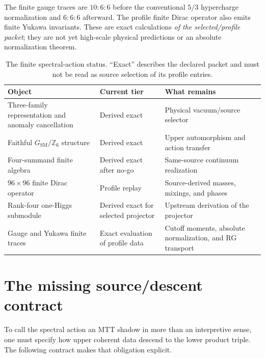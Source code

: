 \documentclass[11pt]{article}
\begin{document}
The finite gauge traces are $10:6:6$ before the conventional $5/3$
hypercharge normalization and $6:6:6$ afterward.  The profile finite Dirac
operator also emits finite Yukawa invariants.  These are exact calculations
\emph{of the selected/profile packet}; they are not yet high-scale physical
predictions or an absolute normalization theorem.

\begin{table}[ht]
\centering
\small
\begin{tabular}{>{\raggedright\arraybackslash}p{}
                >{\raggedright\arraybackslash}p{}
                >{\raggedright\arraybackslash}p{}}
\toprule
Object & Current tier & What remains \\
\midrule
Three-family representation and anomaly cancellation
& Derived exact
& Physical vacuum/source selector \\
Faithful $G_{\mathrm{SM}}/\mathbb{Z}_6$ structure
& Derived exact
& Upper automorphism and action transfer \\
Four-summand finite algebra
& Derived exact after no-go
& Same-source continuum realization \\
$96\times96$ finite Dirac operator
& Profile replay
& Source-derived masses, mixings, and phases \\
Rank-four one-Higgs submodule
& Derived exact for selected projector
& Upstream derivation of the projector \\
Gauge and Yukawa finite traces
& Exact evaluation of profile data
& Cutoff moments, absolute normalization, and RG transport \\
\bottomrule
\end{tabular}
\caption{The finite spectral-action status.  ``Exact'' describes the declared
packet and must not be read as source selection of its profile entries.}
\label{tab:status}
\end{table}

\section{The missing source/descent contract}

To call the spectral action an MTT shadow in more than an interpretive sense,
one must specify how upper coherent data descend to the lower product triple.
The following contract makes that obligation explicit.
\end{document}
